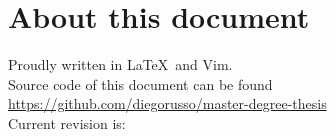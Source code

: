\chapter*{About this document}

Proudly written in \LaTeX\ and Vim.\\

Source code of this document can be found \url{https://github.com/diegorusso/master-degree-thesis}\\

Current revision is: \Revision\\
